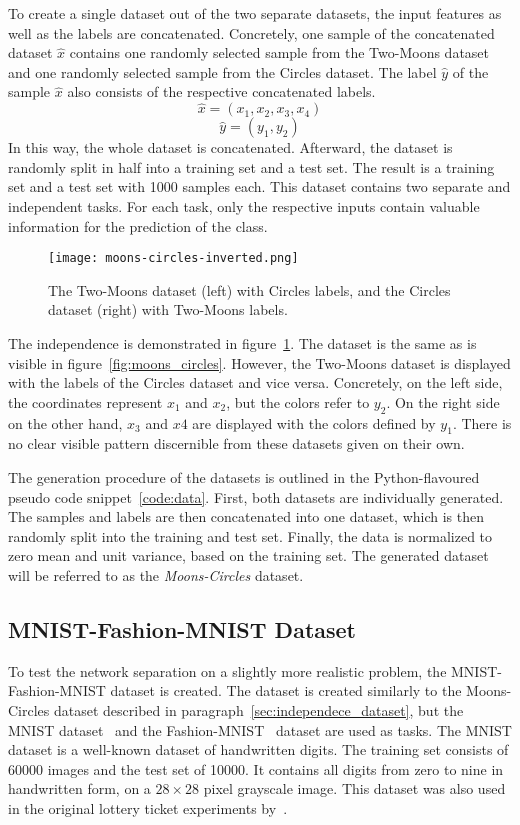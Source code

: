 To create a single dataset out of the two separate datasets, the input features as well as the labels are concatenated.
Concretely, one sample of the concatenated dataset $\hat x$ contains one randomly selected sample from the Two-Moons dataset and one randomly selected sample from the Circles dataset.
The label $\hat y$ of the sample $\hat x$ also consists of the respective concatenated labels.
\[\hat x = ( x_1 , x_2 , x_3 , x_4 )\]
\[\hat y = ( y_1 , y_2 )\]
In this way, the whole dataset is concatenated.
Afterward, the dataset is randomly split in half into a training set and a test set.
The result is a training set and a test set with 1000 samples each.
This dataset contains two separate and independent tasks.
For each task, only the respective inputs contain valuable information for the prediction of the class.

\begin{figure}[t]
    \centering\texttt{[image: moons-circles-inverted.png]}
    \caption[Two-Moons and Circles Dataset, inverted labels]{
        The Two-Moons dataset (left) with Circles labels, and the Circles dataset (right) with Two-Moons labels. 
    }\label{fig:moons_circles_inverted}
\end{figure}

The independence is demonstrated in figure~\ref{fig:moons_circles_inverted}.
The dataset is the same as is visible in figure~\ref{fig:moons_circles}. 
However, the Two-Moons dataset is displayed with the labels of the Circles dataset and vice versa.
Concretely, on the left side, the coordinates represent $x_1$ and $x_2$, but the colors refer to $y_2$.
On the right side on the other hand, $x_3$ and $x4$ are displayed with the colors defined by $y_1$.
There is no clear visible pattern discernible from these datasets given on their own.

The generation procedure of the datasets is outlined in the Python-flavoured pseudo code snippet~\ref{code:data}.
First, both datasets are individually generated.
The samples and labels are then concatenated into one dataset, which is then randomly split into the training and test set.
Finally, the data is normalized to zero mean and unit variance, based on the training set.
The generated dataset will be referred to as the \textit{Moons-Circles} dataset.

\subsection{MNIST-Fashion-MNIST Dataset}\label{sec:mnist}
To test the network separation on a slightly more realistic problem, the MNIST-Fashion-MNIST dataset is created.
The dataset is created similarly to the Moons-Circles dataset described in paragraph~\ref{sec:independece_dataset}, but the MNIST dataset~\autocite{mnist} and the Fashion-MNIST~\autocite{fashion} dataset are used as tasks.
The MNIST dataset is a well-known dataset of handwritten digits. 
The training set consists of 60000 images and the test set of 10000.
It contains all digits from zero to nine in handwritten form, on a $28 \times 28$ pixel grayscale image.
This dataset was also used in the original lottery ticket experiments by~\textcite{LTH}.

